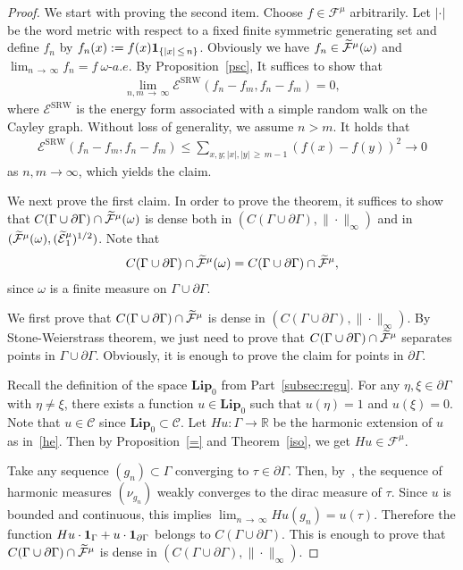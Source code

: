 \documentclass[AHL,Unicode,longabstracts,published]{cedram}
\newcommand{\ce}{\mathcal{E}}
\newcommand{\cf}{\mathcal{F}}
\newcommand{\cC}{\mathcal{C}}
\newcommand{\br}{\mathbb{R}}
\newcommand{\bfLip}{\mathbf{Lip}}
\newcommand{\SRW}{\mathrm{SRW}}
\let\oldtilde\tilde
\renewcommand*{\tilde}[1]{\mathchoice{\widetilde{#1}}{\widetilde{#1}}{\oldtilde{#1}}{\oldtilde{#1}}}
\begin{document}
\begin{proof}
We start with proving the second item. Choose $f\in\cf^{\mu}$ arbitrarily. Let $|\cdot|$ be the word metric with respect to a fixed finite symmetric generating set and define $f_n$ by $f_n(x):=f(x){\bf 1}_{\{|x|\,\leq\,n\}}$. Obviously we have $f_n\in\tilde\cf^{\mu}(\omega)$ and $\lim_{n\,\to\,\infty}f_n=f\ \omega$-$a.e.$ By Proposition~\ref{psc}, It suffices to show that
\begin{align}\label{lim0}
\lim_{n,m\,\to\,\infty}\ce^\SRW\left(f_n-f_m,f_n-f_m\right)=0,
\end{align}
where $\ce^\SRW$ is the energy form associated with a simple random walk on the Cayley graph. Without loss of generality, we assume $n>m$. It holds that
\begin{align*}
\ce^\SRW\left(f_n-f_m,f_n-f_m\right)\leq \sum_{x,y; |x|,|y|\,\geq\,m-1}\left(f(x)-f(y)\right)^2\to 0
\end{align*}
as $n,m\to\infty$, which yields the claim.


We next prove the first claim. In order to prove the theorem, it suffices to show that $C(\Gamma\cup\partial\Gamma)\cap\tilde\cf^{\mu}(\omega)$ is dense both in $(C(\Gamma\cup\partial\Gamma),\|\cdot\|_{\infty})$ and in $(\tilde\cf^{\mu}(\omega), (\tilde\ce^{\mu}_1)^{1/2})$. Note that
\begin{align*}
C(\Gamma\cup\partial\Gamma)\cap\tilde\cf^{\mu}(\omega)= C(\Gamma\cup\partial\Gamma)\cap\tilde\cf^{\mu},
\end{align*}
since $\omega$ is a finite measure on $\Gamma\cup\partial\Gamma$.


We first prove that $C(\Gamma\cup\partial\Gamma)\cap\tilde\cf^{\mu}$ is dense in $(C(\Gamma\cup\partial\Gamma),\|\cdot\|_{\infty})$. By Stone-Weierstrass theorem, we just need to prove that $C(\Gamma\cup\partial\Gamma)\cap\tilde\cf^{\mu}$ separates points in $\Gamma\cup\partial\Gamma$. Obviously, it is enough to prove the claim for points in $\partial\Gamma$.

Recall the definition of the space $\bfLip_0$ from Part~\ref{subsec:regu}. For any $\eta,\xi\in\partial\Gamma$ with $\eta\neq\xi$, there exists a function $u\in\bfLip_0$ such that $u(\eta)=1$ and $u(\xi)=0$. Note that $u\in\cC$ since $\bfLip_0\subset\cC$. Let $Hu:\Gamma\rightarrow\br$ be the harmonic extension of $u$ as in~\eqref{he}. Then by Proposition~\ref{=} and Theorem~\ref{iso}, we get $Hu\in\cf^{\mu}$.

Take any sequence $(g_n)\subset\Gamma$ converging to $\tau\in\partial\Gamma$. Then, by~\cite[Lemma~2.2]{Ka}, the sequence of harmonic measures $(\nu_{g_n})$ weakly converges to the dirac measure of $\tau$. Since $u$ is bounded and continuous, this implies $\lim_{n\,\to\,\infty}Hu(g_n)=u(\tau)$. Therefore the function $Hu\cdot{\bf 1}_{\Gamma}+ u\cdot{\bf 1}_{\partial\Gamma}$ belongs to $C(\Gamma\cup\partial\Gamma)$. This is enough to prove that $C(\Gamma\cup\partial\Gamma)\cap\tilde\cf^{\mu}$ is dense in $(C(\Gamma\cup\partial\Gamma),\|\cdot\|_{\infty})$.


\end{proof}
\end{document}
